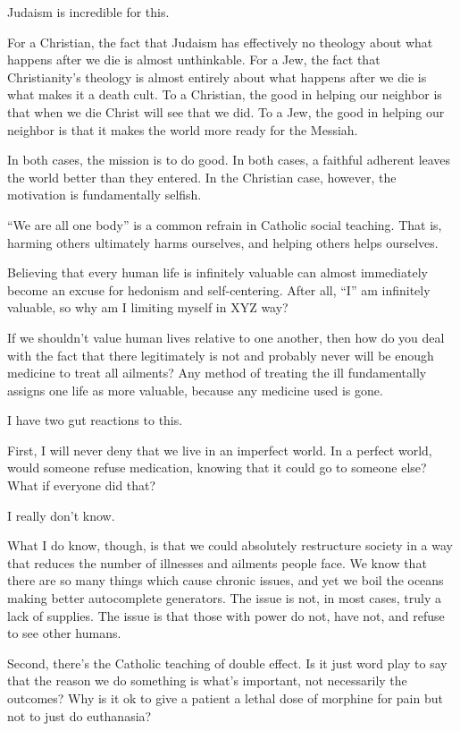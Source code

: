\documentclass[12pt]{article}
\newcommand{\say}[1]{``#1''}
\renewcommand{\,}{\textsuperscript{,}}
\begin{document}
Judaism is incredible for this.

For a Christian, the fact that Judaism has effectively no theology about what happens after we die is almost unthinkable.  
For a Jew, the fact that Christianity's theology is almost entirely about what happens after we die is what makes it a death cult.  
To a Christian, the good in helping our neighbor is that when we die Christ will see that we did.  
To a Jew, the good in helping our neighbor is that it makes the world more ready for the Messiah.

In both cases, the mission is to do good.  
In both cases, a faithful adherent leaves the world better than they entered.  
In the Christian case, however, the motivation is fundamentally selfish.

\say{We are all one body} is a common refrain in Catholic social teaching.  
That is, harming others ultimately harms ourselves, and helping others helps ourselves.

Believing that every human life is infinitely valuable can almost immediately become an excuse for hedonism and self-centering.  
After all, \say{I} am infinitely valuable, so why am I limiting myself in XYZ way?

If we shouldn't value human lives relative to one another, then how do you deal with the fact that there legitimately is not and probably never will be enough medicine to treat all ailments?  
Any method of treating the ill fundamentally assigns one life as more valuable, because any medicine used is gone.

I have two gut reactions to this.

First, I will never deny that we live in an imperfect world.  
In a perfect world, would someone refuse medication, knowing that it could go to someone else?  
What if everyone did that?

I really don't know.

What I do know, though, is that we could absolutely restructure society in a way that reduces the number of illnesses and ailments people face.  
We know that there are so many things which cause chronic issues, and yet we boil the oceans making better autocomplete generators.  
The issue is not, in most cases, truly a lack of supplies.  
The issue is that those with power do not, have not, and refuse to see other humans.

Second, there's the Catholic teaching of double effect.  
Is it just word play to say that the reason we do something is what's important, not necessarily the outcomes?  
Why is it ok to give a patient a lethal dose of morphine for pain but not to just do euthanasia?
\end{document}

